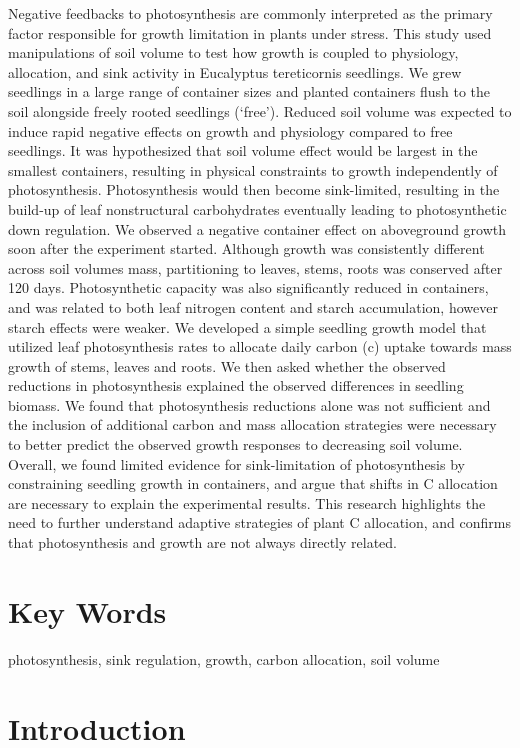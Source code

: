 \documentclass[a4paper]{article}\usepackage[]{graphicx}\usepackage[]{color}
\begin{document}
Negative feedbacks to photosynthesis are commonly interpreted as the primary factor responsible for growth limitation in plants under stress.  This study used manipulations of soil volume to test how growth is coupled to physiology, allocation, and sink activity in Eucalyptus tereticornis seedlings. We grew seedlings in a large range of container sizes and planted containers flush to the soil alongside freely rooted seedlings (‘free’). Reduced soil volume was expected to induce rapid negative effects on growth and physiology compared to free seedlings. It was hypothesized that soil volume effect would be largest in the smallest containers, resulting in physical constraints to growth independently of photosynthesis. Photosynthesis would then become sink-limited, resulting in the build-up of leaf nonstructural carbohydrates eventually leading to photosynthetic down regulation. We observed a negative container effect on aboveground growth soon after the experiment started. Although growth was consistently different across soil volumes mass, partitioning to leaves, stems, roots was conserved after 120 days. Photosynthetic capacity was also significantly reduced in containers, and was related to both leaf nitrogen content and starch accumulation, however starch effects were weaker. We developed a simple seedling growth model that utilized leaf photosynthesis rates to allocate daily carbon (c) uptake towards mass growth of stems, leaves and roots. We then asked whether the observed reductions in photosynthesis explained the observed differences in seedling biomass.  We found that photosynthesis reductions alone was not sufficient and the inclusion of additional carbon and mass allocation strategies were necessary to better predict the observed growth responses to decreasing soil volume. Overall, we found limited evidence for sink-limitation of photosynthesis by constraining seedling growth in containers, and argue that shifts in C allocation are necessary to explain the experimental results. This research highlights the need to further understand adaptive strategies of plant C allocation, and confirms that photosynthesis and growth are not always directly related.

\section*{Key Words}

photosynthesis, sink regulation, growth, carbon allocation, soil volume


\section*{Introduction}
\end{document}
